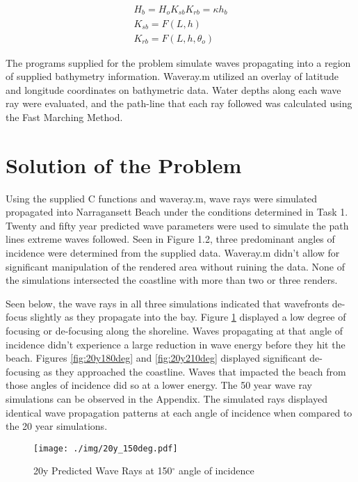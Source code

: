 \begin{align}
H_{b} = H_{o}K_{sb}K_{rb} = \kappa h_{b}
\\ K_{sb} = F(L,h)
\\K_{rb} = F(L,h,\theta_{o})
\label{eq:breaker_char}
\end{align}

The programs supplied for the problem simulate waves propagating into a region of supplied bathymetry information. Waveray.m utilized an overlay of latitude and longitude coordinates on bathymetric data. Water depths along each wave ray were evaluated, and the path-line that each ray followed was calculated using the Fast Marching Method.

\section{Solution of the Problem}

Using the supplied C functions and waveray.m, wave rays were simulated propagated into Narragansett Beach under the conditions determined in Task 1. Twenty and fifty year predicted wave parameters were used to simulate the path lines extreme waves followed. Seen in Figure 1.2, three predominant angles of incidence were determined from the supplied data. Waveray.m didn't allow for significant manipulation of the rendered area without ruining the data. None of the simulations intersected the coastline with more than two or three renders.

Seen below, the wave rays in all three simulations indicated that wavefronts de-focus slightly as they propagate into the bay. Figure \ref{fig:20y150deg} displayed a low degree of focusing or de-focusing along the shoreline. Waves propagating at that angle of incidence didn't experience a large reduction in wave energy before they hit the beach. Figures \ref{fig:20y180deg} and \ref{fig:20y210deg} displayed significant de-focusing as they approached the coastline. Waves that impacted the beach from those angles of incidence did so at a lower energy. The 50 year wave ray simulations can be observed in the Appendix. The simulated rays displayed identical wave propagation patterns at each angle of incidence when compared to the 20 year simulations.

\begin{figure}[H]
\centering
\texttt{[image: ./img/20y\_150deg.pdf]}
\caption{20y Predicted Wave Rays at 150$^{\circ}$ angle of incidence}
\label{fig:20y150deg}
\end{figure}


